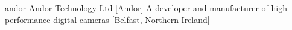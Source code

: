 \newglsXcompany%
{andor}%
{Andor Technology Ltd}%
[Andor]%
{A developer and manufacturer of high performance digital cameras \cite{website:Andor_Technology}}%
[Belfast, Northern Ireland]%